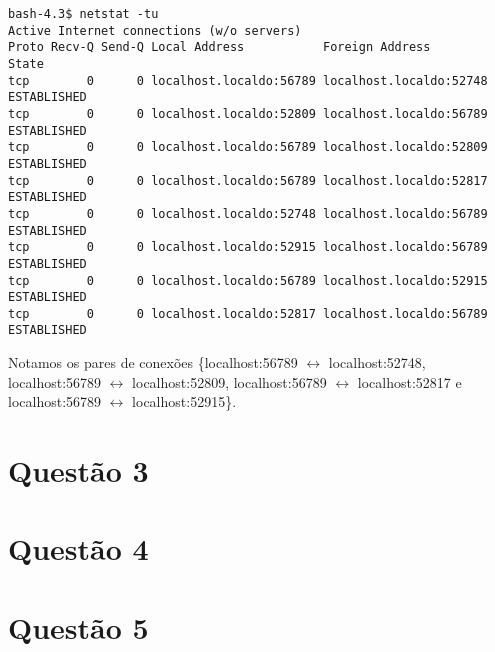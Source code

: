 \documentclass[a4paper,10pt]{article}
\begin{document}
\begin{lstlisting}
bash-4.3$ netstat -tu
Active Internet connections (w/o servers)
Proto Recv-Q Send-Q Local Address           Foreign Address         State      
tcp        0      0 localhost.localdo:56789 localhost.localdo:52748 ESTABLISHED
tcp        0      0 localhost.localdo:52809 localhost.localdo:56789 ESTABLISHED
tcp        0      0 localhost.localdo:56789 localhost.localdo:52809 ESTABLISHED
tcp        0      0 localhost.localdo:56789 localhost.localdo:52817 ESTABLISHED
tcp        0      0 localhost.localdo:52748 localhost.localdo:56789 ESTABLISHED
tcp        0      0 localhost.localdo:52915 localhost.localdo:56789 ESTABLISHED
tcp        0      0 localhost.localdo:56789 localhost.localdo:52915 ESTABLISHED
tcp        0      0 localhost.localdo:52817 localhost.localdo:56789 ESTABLISHED

\end{lstlisting}

Notamos os pares de conexões \{localhost:56789 $\leftrightarrow$ localhost:52748, localhost:56789 $\leftrightarrow$ localhost:52809, localhost:56789 $\leftrightarrow$ localhost:52817 e localhost:56789 $\leftrightarrow$ localhost:52915\}.

\section{Questão 3}

\section{Questão 4}

\section{Questão 5}
\end{document}
